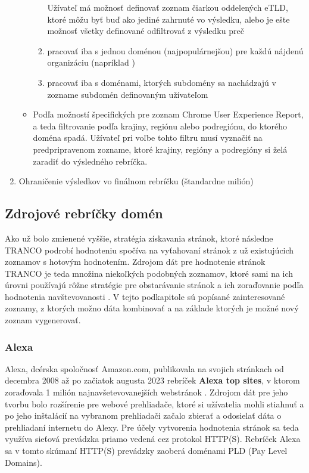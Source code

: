 \begin{enumerate}
\begin{itemize}
\begin{enumerate}
            Užívateľ má možnosť definovať zoznam čiarkou oddelených eTLD, ktoré môžu byť buď ako jediné zahrnuté vo
            výsledku, alebo je ešte možnosť všetky definované odfiltrovať z výsledku preč
            
            \item pracovať iba s jednou doménou (najpopulárnejšou) pre každú nájdenú organizáciu (napríklad )
            \item pracovať iba s doménami, ktorých subdomény sa nachádzajú v zozname subdomén definovaným užívateľom 
        \end{enumerate}

        \item Podľa možností špecifických pre zoznam Chrome User Experience Report, a teda filtrovanie podľa krajiny, regiónu alebo podregiónu, do ktorého doména spadá. Užívateľ pri voľbe tohto filtru musí vyznačiť na predpripravenom zozname, ktoré krajiny, regióny a podregióny si želá zaradiť do výsledného rebríčka.
    \end{itemize}

    \item Ohraničenie výsledkov vo finálnom rebríčku (štandardne milión)
    
\end{enumerate}



\subsection{Zdrojové rebríčky domén}
\label{tranco-source-rankings}

Ako už bolo zmienené vyššie, stratégia získavania stránok, ktoré následne TRANCO podrobí hodnoteniu spočíva na vyťahovaní stránok z už existujúcich zoznamov s hotovým hodnotením. 
Zdrojom dát pre hodnotenie stránok TRANCO je teda množina niekoľkých podobných zoznamov, ktoré sami na ich úrovni používajú rôžne stratégie pre obstarávanie stránok a ich zoraďovanie 
podľa hodnotenia navštevovanosti \cite{tranco-methodology}. V tejto podkapitole sú popísané zainteresované zoznamy, z ktorých možno dáta kombinovať 
a na základe ktorých je možné nový zoznam vygenerovať.

\subsubsection{Alexa}

Alexa, dcérska spoločnosť Amazon.com, publikovala na svojich stránkach od decembra 2008 až po začiatok augusta 2023 rebríček \textbf{Alexa top sites}, v ktorom zoraďovala 1 milión 
najnavšetevovanejších webstránok \cite{tranco-methodology}.
Zdrojom dát pre jeho tvorbu bolo rozšírenie pre webové prehliadače, ktoré si užívatelia mohli stiahnuť a po jeho inštalácií na vybranom prehliadači začalo zbierať a odosielať
dáta o prehliadaní internetu do Alexy. 
Pre účely vytvorenia hodnotenia stránok sa teda využíva sieťová prevádzka priamo vedená cez protokol HTTP(S). 
Rebríček Alexa sa v tomto skúmaní HTTP(S) prevádzky zaoberá doménami PLD (Pay Level Domains). 

